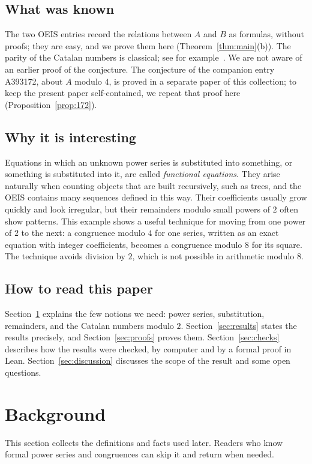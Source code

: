 \documentclass[11pt,a4paper]{article}
\theoremstyle{definition}
\theoremstyle{remark}
\begin{document}
\subsection{What was known}
The two OEIS entries record the relations between $A$ and $B$ as formulas, without proofs; they are easy, and we prove
them here (Theorem~\ref{thm:main}(b)). The parity of the Catalan numbers is classical; see for
example~\cite{deutschsagan}. We are not aware of an earlier proof of the conjecture. The conjecture of the companion
entry A393172, about $A$ modulo $4$, is proved in a separate paper of this collection; to keep the present paper
self-contained, we repeat that proof here (Proposition~\ref{prop:172}).

\subsection{Why it is interesting}
Equations in which an unknown power series is substituted into something, or something is substituted into it, are
called \emph{functional equations}. They arise naturally when counting objects that are built recursively, such as trees,
and the OEIS contains many sequences defined in this way. Their coefficients usually grow quickly and look irregular, but
their remainders modulo small powers of $2$ often show patterns. This example shows a useful technique for moving from
one power of $2$ to the next: a congruence modulo $4$ for one series, written as an exact equation with integer
coefficients, becomes a congruence modulo $8$ for its square. The technique avoids division by $2$, which is not
possible in arithmetic modulo $8$.

\subsection{How to read this paper}
Section~\ref{sec:background} explains the few notions we need: power series, substitution, remainders, and the Catalan
numbers modulo $2$. Section~\ref{sec:results} states the results precisely, and Section~\ref{sec:proofs} proves them.
Section~\ref{sec:checks} describes how the results were checked, by computer and by a formal proof in Lean.
Section~\ref{sec:discussion} discusses the scope of the result and some open questions.
\section{Background}\label{sec:background}
This section collects the definitions and facts used later. Readers who know formal power series and congruences can skip it and return when needed.
\end{document}
